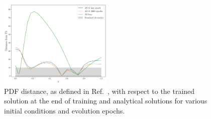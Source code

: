   \begin{figure}[h]
    \centering
    \includegraphics[width=0.48\textwidth]{plots/distance_plot_L0.pdf}
    \caption{PDF distance, as defined in Ref.~\cite{NNPDF:2021njg}, with respect to
    the trained solution at the end of training and analytical
    solutions for various initial conditions and evolution epochs.}
    \label{fig:xT3_distance_L0}
  \end{figure}

